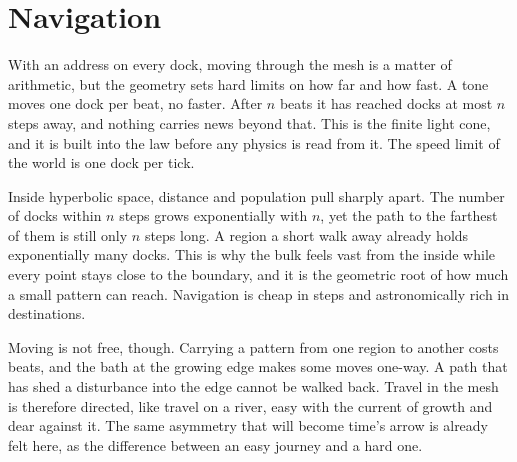 \section{Navigation}

With an address on every dock, moving through the mesh is a matter of arithmetic, but the geometry sets hard limits on how far and how fast. A tone moves one dock per beat, no faster. After $n$ beats it has reached docks at most $n$ steps away, and nothing carries news beyond that. This is the finite light cone, and it is built into the law before any physics is read from it. The speed limit of the world is one dock per tick.

Inside hyperbolic space, distance and population pull sharply apart. The number of docks within $n$ steps grows exponentially with $n$, yet the path to the farthest of them is still only $n$ steps long. A region a short walk away already holds exponentially many docks. This is why the bulk feels vast from the inside while every point stays close to the boundary, and it is the geometric root of how much a small pattern can reach. Navigation is cheap in steps and astronomically rich in destinations.

Moving is not free, though. Carrying a pattern from one region to another costs beats, and the bath at the growing edge makes some moves one-way. A path that has shed a disturbance into the edge cannot be walked back. Travel in the mesh is therefore directed, like travel on a river, easy with the current of growth and dear against it. The same asymmetry that will become time's arrow is already felt here, as the difference between an easy journey and a hard one.
